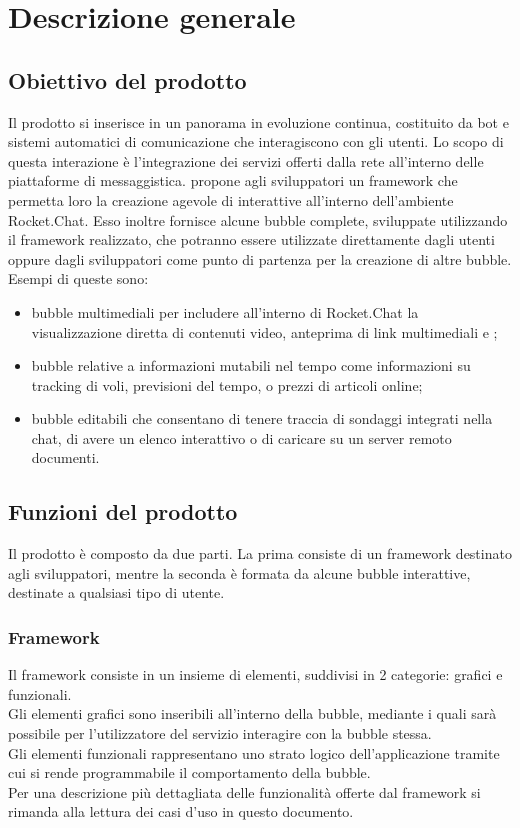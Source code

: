 \section{Descrizione generale}
\subsection{Obiettivo del prodotto}
Il prodotto si inserisce in un panorama in evoluzione continua, costituito da bot e sistemi automatici di comunicazione che interagiscono con gli utenti.
Lo scopo di  questa interazione è l'integrazione dei servizi offerti dalla rete all'interno delle piattaforme di messaggistica. 
\ProjectName{} propone agli sviluppatori un framework che permetta loro la creazione agevole di  interattive all'interno dell'ambiente Rocket.Chat. Esso inoltre fornisce alcune bubble complete, sviluppate utilizzando il framework realizzato, che potranno essere utilizzate direttamente dagli utenti oppure dagli sviluppatori come punto di partenza per la creazione di altre bubble.
Esempi di queste sono: 
\begin{itemize}
	\item bubble multimediali per includere all'interno di Rocket.Chat la visualizzazione diretta di contenuti video, anteprima di link multimediali e ;
	\item bubble relative a informazioni mutabili nel tempo come informazioni su tracking di voli, previsioni del tempo, o prezzi di articoli online;
	\item bubble editabili che consentano di tenere traccia di sondaggi integrati nella chat, di avere un elenco interattivo o di caricare su un server remoto documenti.
\end{itemize}

\subsection{Funzioni del prodotto}
Il prodotto è composto da due parti. La prima consiste di un framework destinato agli sviluppatori, mentre la seconda è formata da alcune bubble interattive, destinate a qualsiasi tipo di utente.

\subsubsection{Framework}
Il framework consiste in un insieme di elementi, suddivisi in 2 categorie: grafici e funzionali.\\
Gli elementi grafici sono  inseribili all'interno della bubble, mediante i quali sarà possibile per l'utilizzatore del servizio interagire con la bubble stessa.\\
Gli elementi funzionali rappresentano uno strato logico dell'applicazione tramite cui si rende programmabile il comportamento della bubble.\\
Per una descrizione più dettagliata delle funzionalità offerte dal framework si rimanda alla lettura dei casi d'uso in questo documento.


